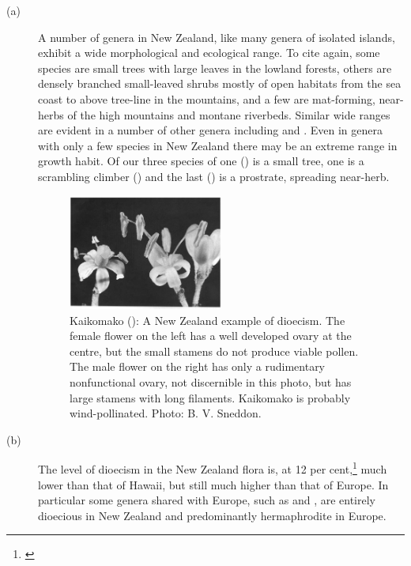 \begin{description}
\item[{(a)}]A number of genera in New Zealand, like many genera of isolated islands, exhibit a wide morphological and ecological range.
To cite  again, some species are small trees with large leaves in the lowland forests, others are densely branched small-leaved shrubs mostly of open habitats from the sea coast to above tree-line in the mountains, and a few are mat-forming, near-herbs of the high mountains and montane riverbeds.
Similar wide ranges are evident in a number of other genera including  and .
Even in genera with only a few species in New Zealand there may be an extreme range in growth habit.
Of our three species of  one () is a small tree, one is a scrambling climber () and the last () is a prostrate, spreading near-herb.
\begin{figure}
	\includegraphics[width=0.5\textwidth]{graphics/figure4kaikomako.jpg}
	\centering
	\caption[Kaikomako: A New Zealand example of dioecism]{Kaikomako (): A New Zealand example of dioecism.
	The female flower on the left has a well developed ovary at the centre, but the small stamens do not produce viable pollen.
	The male flower on the right has only a rudimentary nonfunctional ovary, not discernible in this photo, but has large stamens with long filaments.
	Kaikomako is probably wind-pollinated.
	Photo: B. V. Sneddon.}%
	\label{fig:4kaikomako}
\end{figure}
\item[{(b)}]The level of dioecism in the New Zealand flora is, at 12 per cent,\footnote{\cite{godley1979flower}} much lower than that of Hawai{\okina}i, but still much higher than that of Europe.
In particular some genera shared with Europe, such as  and , are entirely dioecious in New Zealand and predominantly hermaphrodite in Europe.

\end{description}
